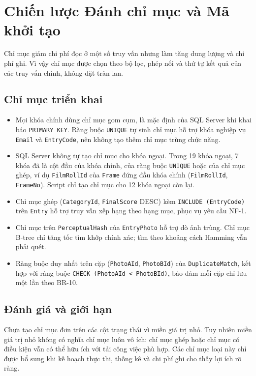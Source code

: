 \section{Chiến lược Đánh chỉ mục và Mã khởi tạo}

Chỉ mục giảm chi phí đọc ở một số truy vấn nhưng làm tăng dung lượng và chi phí ghi. Vì vậy chỉ mục được chọn theo bộ lọc, phép nối và thứ tự kết quả của các truy vấn chính, không đặt tràn lan.

\subsection{Chỉ mục triển khai}


\begin{itemize}
    \item Mọi khóa chính dùng chỉ mục gom cụm, là mặc định của SQL Server khi khai báo \texttt{PRIMARY KEY}. Ràng buộc \texttt{UNIQUE} tự sinh chỉ mục hỗ trợ khóa nghiệp vụ \texttt{Email} và \texttt{EntryCode}, nên không tạo thêm chỉ mục trùng chức năng.
    \item SQL Server không tự tạo chỉ mục cho khóa ngoại. Trong 19 khóa ngoại, 7 khóa đã là cột đầu của khóa chính, của ràng buộc \texttt{UNIQUE} hoặc của chỉ mục ghép, ví dụ \texttt{FilmRollId} của \texttt{Frame} đứng đầu khóa chính (\texttt{FilmRollId}, \texttt{FrameNo}). Script chỉ tạo chỉ mục cho 12 khóa ngoại còn lại.
    \item Chỉ mục ghép (\texttt{CategoryId}, \texttt{FinalScore} DESC) kèm \texttt{INCLUDE (EntryCode)} trên \texttt{Entry} hỗ trợ truy vấn xếp hạng theo hạng mục, phục vụ yêu cầu NF-1.
    \item Chỉ mục trên \texttt{PerceptualHash} của \texttt{EntryPhoto} hỗ trợ dò ảnh trùng. Chỉ mục B-tree chỉ tăng tốc tìm khớp chính xác; tìm theo khoảng cách Hamming vẫn phải quét.
    \item Ràng buộc duy nhất trên cặp (\texttt{PhotoAId}, \texttt{PhotoBId}) của \texttt{DuplicateMatch}, kết hợp với ràng buộc \texttt{CHECK (PhotoAId < PhotoBId)}, bảo đảm mỗi cặp chỉ lưu một lần theo BR-10.
\end{itemize}


\subsection{Đánh giá và giới hạn}

Chưa tạo chỉ mục đơn trên các cột trạng thái vì miền giá trị nhỏ. Tuy nhiên miền giá trị nhỏ không có nghĩa chỉ mục luôn vô ích: chỉ mục ghép hoặc chỉ mục có điều kiện vẫn có thể hữu ích với tải công việc phù hợp. Các chỉ mục loại này chỉ được bổ sung khi kế hoạch thực thi, thống kê và chi phí ghi cho thấy lợi ích rõ ràng.

